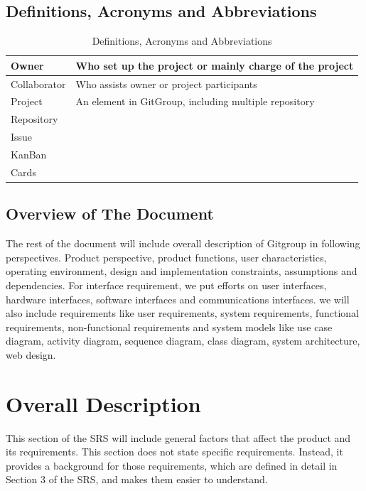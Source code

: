 \documentclass[12pt,a4paper]{report}
\begin{document}
\section[Def., Acronyms and Abbr.]{Definitions, Acronyms and Abbreviations}
\begin{table}[H]
	\centering
	\begin{tabular}{|l|l|}
		\hline
		Owner        & Who set up the project or mainly charge of the project \\ \hline
		Collaborator & Who assists owner or project participants              \\ \hline
		Project      & An element in GitGroup, including multiple repository  \\ \hline
		Repository   &                                                        \\ \hline
		Issue        &                                                        \\ \hline
		KanBan       &                                                        \\ \hline
		Cards        &                                                        \\ \hline
	\end{tabular}
	\caption{Definitions, Acronyms and Abbreviations}
\end{table}
\section{Overview of The Document}
The rest of the document will include overall description of Gitgroup in following perspectives. Product perspective, product functions, user characteristics, operating environment, design and implementation constraints, assumptions and dependencies. For interface requirement, we put efforts on user interfaces, hardware interfaces, software interfaces and communications interfaces. we will also include requirements like user requirements, system requirements, functional requirements, non-functional requirements and system models like use case diagram, activity diagram, sequence diagram, class diagram, system architecture, web design. 

\chapter{Overall Description}
This section of the SRS will include general factors that affect the product and its requirements. This section does not state specific requirements. Instead, it provides a background for those requirements, which are defined in detail in Section 3 of the SRS, and makes them easier to understand. 
\end{document}
